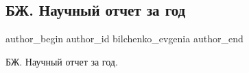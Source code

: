  
 
 
 
 
 
\subsection{БЖ. Научный отчет за год}
\label{sec:31_12_2020.fb.bilchenko_evgenia.1.nauchnyj_otchet_za_god}
\ifcmt
 author_begin
   author_id bilchenko_evgenia
 author_end
\fi

БЖ. Научный отчет за год.

